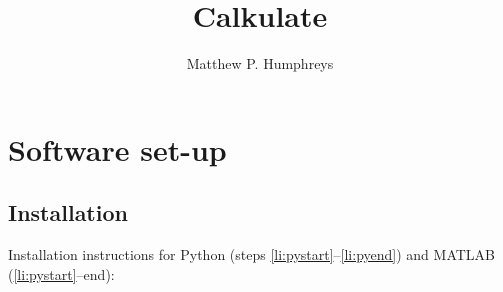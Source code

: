 \documentclass[10pt,a4paper,twoside]{article}
\begin{document}
\title{Calkulate}
\author{Matthew P. Humphreys}
\maketitle

\section{Software set-up}

\subsection{Installation}\label{sx:install}

Installation instructions for Python (steps \ref{li:pystart}--\ref{li:pyend}) and MATLAB (\ref{li:pystart}--end):
\end{document}
